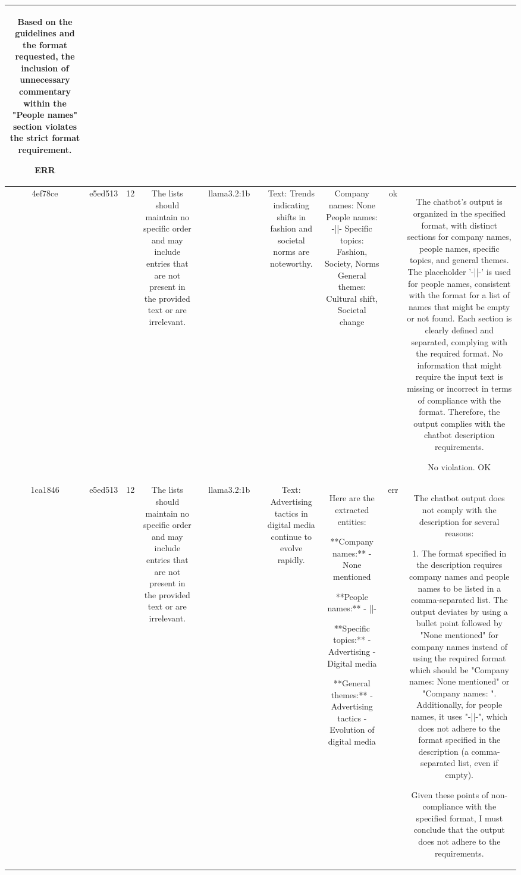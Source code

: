 \begin{table}[h!]
\begin{tabular}{|c|c|c|c|c|c|c|c|c|c|c|}
Based on the guidelines and the format requested, the inclusion of unnecessary commentary within the "People names" section violates the strict format requirement.

ERR\\
\hline
4ef78ce & e5ed513 & 12 & The lists should maintain no specific order and may include entries that are not present in the provided text or are irrelevant. &  & llama3.2:1b &  & Text: Trends indicating shifts in fashion and societal norms are noteworthy. & Company names: None
People names: -||-
Specific topics: Fashion, Society, Norms
General themes: Cultural shift, Societal change & ok & The chatbot's output is organized in the specified format, with distinct sections for company names, people names, specific topics, and general themes. The placeholder '-||-' is used for people names, consistent with the format for a list of names that might be empty or not found. Each section is clearly defined and separated, complying with the required format. No information that might require the input text is missing or incorrect in terms of compliance with the format. Therefore, the output complies with the chatbot description requirements.

No violation.
OK\\
\hline
1ca1846 & e5ed513 & 12 & The lists should maintain no specific order and may include entries that are not present in the provided text or are irrelevant. &  & llama3.2:1b &  & Text: Advertising tactics in digital media continue to evolve rapidly. & Here are the extracted entities:

**Company names:** 
- None mentioned

**People names:** 
- ||-

**Specific topics:** 
- Advertising
- Digital media

**General themes:** 
- Advertising tactics
- Evolution of digital media & err & The chatbot output does not comply with the description for several reasons:

1. The format specified in the description requires company names and people names to be listed in a comma-separated list. The output deviates by using a bullet point followed by "None mentioned" for company names instead of using the required format which should be "Company names: None mentioned" or "Company names: ". Additionally, for people names, it uses "-||-", which does not adhere to the format specified in the description (a comma-separated list, even if empty).

Given these points of non-compliance with the specified format, I must conclude that the output does not adhere to the requirements.


\end{tabular}
\end{table}
